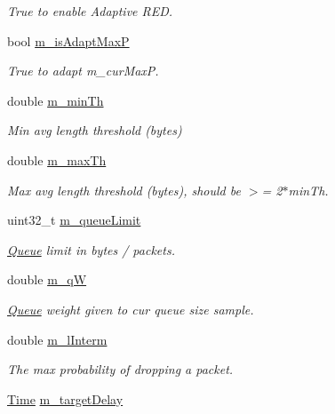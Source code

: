 \begin{DoxyCompactItemize}
\begin{DoxyCompactList}\small\item\em True to enable Adaptive R\+ED. \end{DoxyCompactList}\item 
bool \hyperlink{classns3_1_1RedQueueDisc_a1bb942ecdce8c8c2eb9953f67ae9a0da}{m\+\_\+is\+Adapt\+MaxP}
\begin{DoxyCompactList}\small\item\em True to adapt m\+\_\+cur\+MaxP. \end{DoxyCompactList}\item 
double \hyperlink{classns3_1_1RedQueueDisc_a6c2f13710a589ca7a43e06d16bd889ee}{m\+\_\+min\+Th}
\begin{DoxyCompactList}\small\item\em Min avg length threshold (bytes) \end{DoxyCompactList}\item 
double \hyperlink{classns3_1_1RedQueueDisc_a631761d4c950b0408ba26f42a0509c42}{m\+\_\+max\+Th}
\begin{DoxyCompactList}\small\item\em Max avg length threshold (bytes), should be $>$= 2$\ast$min\+Th. \end{DoxyCompactList}\item 
uint32\+\_\+t \hyperlink{classns3_1_1RedQueueDisc_a421aec8e4b8cca06d16bfc5f8def2623}{m\+\_\+queue\+Limit}
\begin{DoxyCompactList}\small\item\em \hyperlink{classns3_1_1Queue}{Queue} limit in bytes / packets. \end{DoxyCompactList}\item 
double \hyperlink{classns3_1_1RedQueueDisc_aed406d18723a07fe991497553abed6da}{m\+\_\+qW}
\begin{DoxyCompactList}\small\item\em \hyperlink{classns3_1_1Queue}{Queue} weight given to cur queue size sample. \end{DoxyCompactList}\item 
double \hyperlink{classns3_1_1RedQueueDisc_a7ac61b7250a5d9af2fcba2a55e0d3256}{m\+\_\+l\+Interm}
\begin{DoxyCompactList}\small\item\em The max probability of dropping a packet. \end{DoxyCompactList}\item 
\hyperlink{classns3_1_1Time}{Time} \hyperlink{classns3_1_1RedQueueDisc_aa0467c2e9ccdeb445fcd5e876669a3f2}{m\+\_\+target\+Delay}

\end{DoxyCompactItemize}
